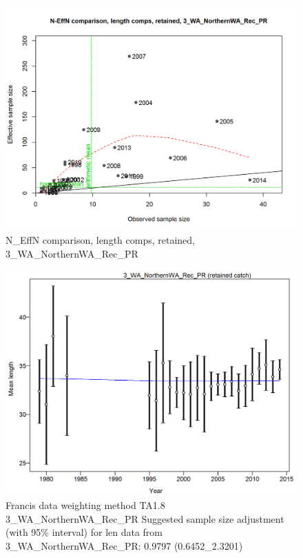 \documentclass[12pt,]{article}
\begin{document}
\begin{figure}[htbp]
\centering
\includegraphics{./r4ss/plots_mod1/comp_lenfit_sampsize_flt3mkt2.png}
\caption{N\_EffN comparison, length comps, retained,
3\_WA\_NorthernWA\_Rec\_PR
\label{fig:mod1_7_comp_lenfit_sampsize_flt3mkt2}}
\end{figure}

\begin{figure}[htbp]
\centering
\includegraphics{./r4ss/plots_mod1/comp_lenfit_data_weighting_TA1.8_3_WA_NorthernWA_Rec_PR.png}
\caption{Francis data weighting method TA1.8 3\_WA\_NorthernWA\_Rec\_PR
Suggested sample size adjustment (with 95\% interval) for len data from
3\_WA\_NorthernWA\_Rec\_PR: 0.9797 (0.6452\_2.3201)
\label{fig:mod1_8_comp_lenfit_data_weighting_TA1.8_3_WA_NorthernWA_Rec_PR}}
\end{figure}
\end{document}
